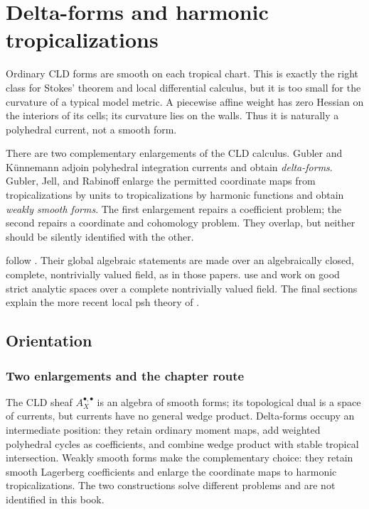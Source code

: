 \chapter{Delta-forms and harmonic tropicalizations}
\label{chap:delta-forms}

Ordinary CLD forms are smooth on each tropical chart.  This is exactly the
right class for Stokes' theorem and local differential calculus, but it is
too small for the curvature of a typical model metric.  A piecewise affine
weight has zero Hessian on the interiors of its cells; its curvature lies on
the walls.  Thus it is naturally a polyhedral current, not a smooth form.

There are two complementary enlargements of the CLD calculus.  Gubler and
K\"unnemann adjoin polyhedral integration currents and obtain
\emph{delta-forms}.  Gubler, Jell, and Rabinoff enlarge the permitted
coordinate maps from tropicalizations by units to tropicalizations by
harmonic functions and obtain \emph{weakly smooth forms}.  The first
enlargement repairs a coefficient problem; the second repairs a coordinate
and cohomology problem.  They overlap, but neither should be silently
identified with the other.

 follow
\cite{GK17,GK19}.  Their global algebraic statements are made over an
algebraically closed, complete, nontrivially valued field, as in those
papers.   use
\cite{GJR26} and work on good strict analytic spaces over a complete
nontrivially valued field.  The final sections explain the more recent local
psh theory of \cite{GR25PL,GR25Classical}.

\section{Orientation}
\label{sec:ch18-orientation}

\subsection{Two enlargements and the chapter route}
\label{sec:ch18-route}

The CLD sheaf $A_X^{\bullet,\bullet}$ is an algebra of smooth forms; its
topological dual is a space of currents, but currents have no general wedge
product.  Delta-forms occupy an intermediate position: they retain ordinary
moment maps, add weighted polyhedral cycles as coefficients, and combine
wedge product with stable tropical intersection.  Weakly smooth forms make
the complementary choice: they retain smooth Lagerberg coefficients and
enlarge the coordinate maps to harmonic tropicalizations.  The two
constructions solve different problems and are not identified in this book.

